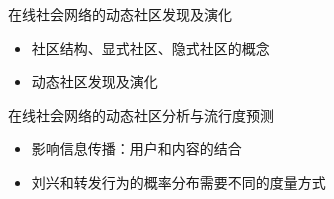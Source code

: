 \documentclass[UTF8]{ctexart}
\begin{document}
\par 在线社会网络的动态社区发现及演化
\begin{itemize}
\item 社区结构、显式社区、隐式社区的概念
\item 动态社区发现及演化
\end{itemize}
\par 在线社会网络的动态社区分析与流行度预测
\begin{itemize}
\item 影响信息传播：用户和内容的结合
\item 刘兴和转发行为的概率分布需要不同的度量方式
\end{itemize}
\end{document}
